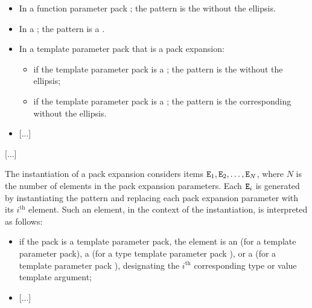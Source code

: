 \documentclass{wg21}
\begin{document}
\begin{itemize}
\item In a function parameter pack ; the pattern is the
 without the ellipsis.

\item In a  ;
the pattern is a .

\item In a template parameter pack that is a pack expansion:
\begin{itemize}
    \item
    if the template parameter pack is a ;
    the pattern is the  without the ellipsis;

    \item
    if the template parameter pack is a ;
    the pattern is the corresponding 
    without the ellipsis. %

\end{itemize}

\item \textcolor{noteclr}{[...]}
\end{itemize}

\textcolor{noteclr}{[...]}

\pnum
The instantiation of a pack expansion considers
items $\texttt{E}_1, \texttt{E}_2, \dotsc, \texttt{E}_N$,
where
$N$ is the number of elements in the pack expansion parameters.
Each $\texttt{E}_i$ is generated by instantiating the pattern and
replacing each pack expansion parameter with its $i^\text{th}$ element.
Such an element, in the context of the instantiation, is interpreted as
follows:
\begin{itemize}
    \item
    if the pack is a template parameter pack, the element is
    an 
    (for a  template parameter pack),
    a 
    (for a type template parameter pack ), or
    a 
    (for a  template parameter pack ),
    designating the $i^\text{th}$ corresponding type or value template argument;

\item \textcolor{noteclr}{[...]}
\end{itemize}
\end{document}
